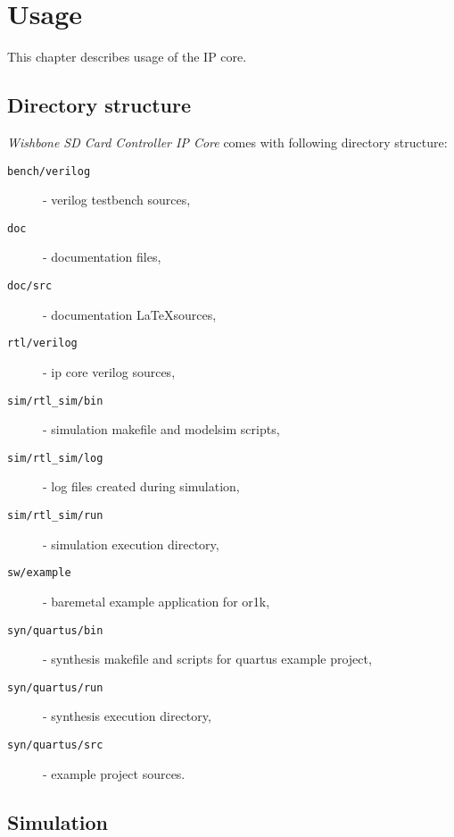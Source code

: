 \section{Usage}
\label{chap:usage}

    This chapter describes usage of the IP core.
    
    \subsection{Directory structure}
    \label{sec:dir_struct}
    
    \textit{Wishbone SD Card Controller IP Core} comes with following directory structure:
    
    
    \begin{description}
    \item[\texttt{bench/verilog}] - verilog testbench sources,
    \item[\texttt{doc}] - documentation files,
    \item[\texttt{doc/src}] - documentation \LaTeX sources,
    \item[\texttt{rtl/verilog}] - ip core verilog sources,
    \item[\texttt{sim/rtl\_sim/bin}] - simulation makefile and modelsim scripts,
    \item[\texttt{sim/rtl\_sim/log}] - log files created during simulation,
    \item[\texttt{sim/rtl\_sim/run}] - simulation execution directory,
    \item[\texttt{sw/example}] - baremetal example application for or1k,
    \item[\texttt{syn/quartus/bin}] - synthesis makefile and scripts for quartus example project,
    \item[\texttt{syn/quartus/run}] - synthesis execution directory,
    \item[\texttt{syn/quartus/src}] - example project sources.
    \end{description}
    
    \subsection{Simulation}
    \label{sec:simulation}
    
